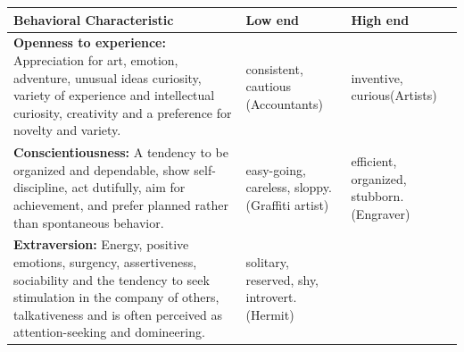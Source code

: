 \documentclass[]{book}
\begin{document}
\begin{longtable}[]{@{}lll@{}}
\toprule
\begin{minipage}[b]{0.44\columnwidth}\raggedright
Behavioral Characteristic\strut
\end{minipage} & \begin{minipage}[b]{0.28\columnwidth}\raggedright
Low end\strut
\end{minipage} & \begin{minipage}[b]{0.20\columnwidth}\raggedright
High end\strut
\end{minipage}\tabularnewline
\midrule
\endhead
\begin{minipage}[t]{0.44\columnwidth}\raggedright
\textbf{Openness to experience:} Appreciation for art, emotion, adventure, unusual ideas curiosity, variety of experience and intellectual curiosity, creativity and a preference for novelty and variety.\strut
\end{minipage} & \begin{minipage}[t]{0.28\columnwidth}\raggedright
consistent, cautious (Accountants)\strut
\end{minipage} & \begin{minipage}[t]{0.20\columnwidth}\raggedright
inventive, curious(Artists)\strut
\end{minipage}\tabularnewline
\begin{minipage}[t]{0.44\columnwidth}\raggedright
\textbf{Conscientiousness:} A tendency to be organized and dependable, show self-discipline, act dutifully, aim for achievement, and prefer planned rather than spontaneous behavior.\strut
\end{minipage} & \begin{minipage}[t]{0.28\columnwidth}\raggedright
easy-going, careless, sloppy. (Graffiti artist)\strut
\end{minipage} & \begin{minipage}[t]{0.20\columnwidth}\raggedright
efficient, organized, stubborn. (Engraver)\strut
\end{minipage}\tabularnewline
\begin{minipage}[t]{0.44\columnwidth}\raggedright
\textbf{Extraversion:} Energy, positive emotions, surgency, assertiveness, sociability and the tendency to seek stimulation in the company of others, talkativeness and is often perceived as attention-seeking and domineering.\strut
\end{minipage} & \begin{minipage}[t]{0.28\columnwidth}\raggedright
solitary, reserved, shy, introvert. (Hermit)\strut

\end{minipage}
\end{longtable}
\end{document}
